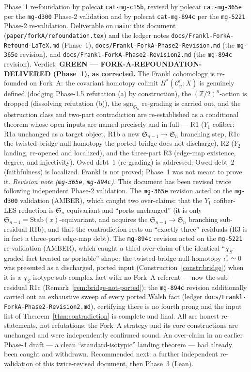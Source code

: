 \documentclass[11pt,oneside]{amsart}
\theoremstyle{plain}
\theoremstyle{definition}
\theoremstyle{remark}
\theoremstyle{honeststyle}
\newcommand{\sgn}{\mathrm{sgn}}
\newcommand{\Sym}{\mathfrak{S}}
\newcommand{\Z}{\mathbb{Z}}
\newcommand{\Cn}{\mathcal{C}^{\cap}_n}
\newcommand{\walsh}[1]{\chi_{#1}}
\begin{document}
\medskip
\noindent\footnotesize Phase~1 re-foundation by polecat
\texttt{cat-mg-c15b}, revised by polecat \texttt{cat-mg-365e} per the
\texttt{mg-d300} Phase-2 validation and by polecat
\texttt{cat-mg-894c} per the \texttt{mg-5221} Phase-2 re-validation.
Deliverable on \texttt{main}: this document
(\texttt{paper/forkA/refoundation.tex}) and the ledger notes
\texttt{docs/Frankl-ForkA-Refound-LaTeX.md} (Phase~1),
\texttt{docs/Frankl-ForkA-Phase2-Revision.md} (the \texttt{mg-365e}
revision), and \texttt{docs/Frankl-ForkA-Phase2-Revision2.md} (the
\texttt{mg-894c} revision).
Verdict: \textbf{GREEN --- FORK-A-REFOUNDATION-DELIVERED (Phase~1),
as corrected.} The Frankl cohomology is re-founded on Fork~A: the
covariant homotopy colimit $H^{*}(\Cn;X)$ is genuinely defined
(dodging Phase-1.5 refutation (a) by construction), the
$(\Z/2)^n$-action is dropped (dissolving refutation (b)), the
$\sgn_{\Sym_n}$ re-grading is carried out, and the obstruction class
and two-part contradiction are re-established as a conditional theorem
whose open inputs are named precisely and in full --- R1 ($Y_1$
cofiber: R1a unchanged as a target object, R1b a new
$\Sym_{n-1}\to\Sym_n$ branching step, R1c the twisted-bridge
null-homotopy the ported bridge does not discharge), R2 ($Y_2$
landing, re-opened and localized), and the three-part R3 (edge-map
existence, degree, and injectivity). Owed debt~1 (re-grading) is
addressed; Owed debt~2 (faithfulness) is localized. Frankl is not
proved; Phase~1 was not meant to prove it. \emph{Revision note
(\texttt{mg-365e}, \texttt{mg-894c}).} This document has been revised
twice following independent Phase-2 validation. The \texttt{mg-365e}
revision acted on the \texttt{mg-d300} validation (AMBER), which
caught two over-claims: that the $Y_1$ cofiber-LES reduction is
$\Sym_n$-equivariant and ``ports unchanged'' (it is only
$\Sym_{n-1}=\mathrm{Stab}(x)$-equivariant, and acquires the
$\Sym_{n-1}\to\Sym_n$ branching sub-residual R1b), and that the
contradiction rests on ``exactly three'' residuals (R3 is in fact a
three-part edge-map debt). The \texttt{mg-894c} revision acted on the
\texttt{mg-5221} re-validation (AMBER), which caught a third
over-claim of the identical ``$\walsh{S}$-graded fact treated as
portable'' shape: the twisted-bridge null-homotopy
$\iota_x^{*}\simeq0$ was presented as a discharged, ported input
(Construction~\ref{constr:bridge}) when it is a
$\walsh{S}$-isotype-sub-complex fact with no Fork~A referent --- now
the sub-residual R1c (Remark~\ref{rem:bridge-not-ported}); the
\texttt{mg-894c} revision additionally carried out an exhaustive
sweep of every ported Walsh fact (ledger
\texttt{docs/Frankl-ForkA-Phase2-Revision2.md}), certifying there is
no fourth prong and the input list of
Theorem~\ref{thm:contradiction} is complete and final. All are
honest re-statements, not refutations; the Fork~A strategy and its
core constructions are unchanged and were independently confirmed
sound. An over-claim in an earlier Phase-1 draft --- a clean
``standard-isotypic'' landing theorem --- had already been caught and
withdrawn. Recommended next: a further independent re-validation of
this twice-revised document, then Phase~3 (Lean).
\end{document}
